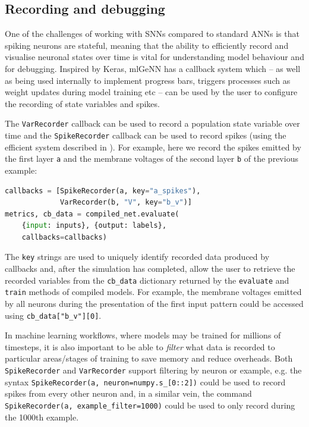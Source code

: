 \documentclass[sigconf]{acmart}
\begin{document}
\subsection{Recording and debugging}
One of the challenges of working with SNNs compared to standard ANNs is that spiking neurons are stateful, meaning that the ability to efficiently record and visualise neuronal states over time is vital for understanding model behaviour and for debugging.
Inspired by Keras, mlGeNN has a callback system which -- as well as being used internally to implement progress bars, triggers processes such as weight updates during model training etc -- can be used by the user to configure the recording of state variables and spikes.

The \lstinline{VarRecorder} callback can be used to record a population state variable over time and the \lstinline{SpikeRecorder} callback can be used to record spikes (using the efficient system described in \citet{Knight2021}).
For example, here we record the spikes emitted by the first layer \lstinline{a} and the membrane voltages of the second  layer \lstinline{b} of the previous example:
\begin{lstlisting}[language=Python]
callbacks = [SpikeRecorder(a, key="a_spikes"),
             VarRecorder(b, "V", key="b_v")]
metrics, cb_data = compiled_net.evaluate(
    {input: inputs}, {output: labels},
    callbacks=callbacks)
\end{lstlisting}
The \lstinline{key} strings are used to uniquely identify recorded data produced by callbacks and, after the simulation has completed, allow the user to retrieve the recorded variables from the \lstinline{cb_data} dictionary returned by the \lstinline{evaluate} and \lstinline{train} methods of compiled models.
For example, the membrane voltages emitted by all neurons during the presentation of the first input pattern could be accessed using \lstinline{cb_data["b_v"][0]}.

In machine learning workflows, where models may be trained for millions of timesteps, it is also important to be able to \emph{filter} what data is recorded to particular areas/stages of training to save memory and reduce overheads.
Both \lstinline{SpikeRecorder} and \lstinline{VarRecorder} support
filtering by neuron or example, e.g. the syntax
\lstinline{SpikeRecorder(a, neuron=numpy.s_[0::2])} could be used to
record spikes from every other neuron and, in a similar vein, the command \lstinline{SpikeRecorder(a, example_filter=1000)} could be used to only record during the 1000th example.
\end{document}
